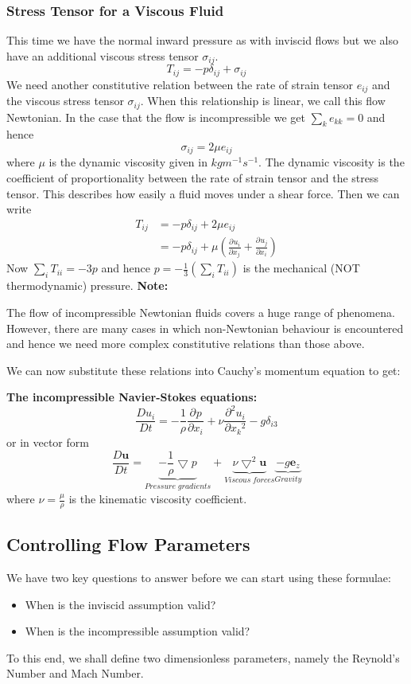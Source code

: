 \documentclass[11pt]{article}
\newcommand*{\pd}[3][]{\ensuremath{\frac{\partial^{#1} {#2}}{\partial {#3}^{#1}}}}
\newcommand*{\md}[1]{\ensuremath{\frac{D #1}{D t}}}
\newcommand{\grad}{\bigtriangledown}
\newcommand{\mv}[1]{\bm{#1}}
\newcommand{\mdf}[1]{{\color{red}#1}}
\newenvironment{note}
    {\textbf{Note:}\begin{mdframed}[backgroundcolor=white, roundcorner=5pt, linewidth=0pt]}
    {\end{mdframed}}
\newenvironment{formula}
	{\begin{mdframed}[backgroundcolor=white, roundcorner=5pt, linewidth=1pt, linecolor=red]}
	{\end{mdframed}}
\begin{document}
\subsubsection{Stress Tensor for a Viscous Fluid}
This time we have the normal inward pressure as with inviscid flows but we also have an additional \mdf{viscous stress tensor} $\sigma_{ij}$.
$$T_{ij}=-p\delta_{ij}+\sigma_{ij}$$
We need another constitutive relation between the rate of strain tensor $e_{ij}$ and the viscous stress tensor $\sigma_{ij}$.
When this relationship is linear, we call this flow \mdf{Newtonian}.
In the case that the flow is incompressible we get $\sum_k e_{kk}=0$ and hence
$$\sigma_{ij}=2\mu e_{ij}$$
where $\mu$ is the dynamic viscosity given in $kgm^{-1}s^{-1}$. The dynamic viscosity is the coefficient of proportionality between the rate of strain tensor and the stress tensor. This describes how easily a fluid moves under a shear force.
Then we can write
\begin{align*}
	T_{ij}&= -p\delta_{ij}+2\mu e_{ij}\\
		  &= -p\delta_{ij}+\mu\left(\pd{u_i}{x_j}+\pd{u_j}{x_i}\right)
\end{align*}
Now $\sum_i T_{ii} = -3p$ and hence $p=-\frac{1}{3}(\sum_i T_{ii})$ is the mechanical (NOT thermodynamic) pressure.
\begin{note}
The flow of incompressible Newtonian fluids covers a huge range of phenomena.
However, there are many cases in which non-Newtonian behaviour is encountered and hence we need more complex constitutive relations than those above.
\end{note}
We can now substitute these relations into Cauchy's momentum equation to get:
\begin{formula}
\textbf{The incompressible Navier-Stokes equations:}
$$\md{u_i}=-\frac{1}{\rho}\pd{p}{x_i}+\nu\pd[2]{u_i}{x_k}-g\delta_{i3}$$
or in vector form
$$\md{\mv{u}}=\underbrace{-\frac{1}{\rho}\grad{p}}_{Pressure\;gradients}+\underbrace{\nu\grad^2\mv{u}}_{Viscous\;forces}\underbrace{-g\mv{e}_z}_{Gravity}$$
where $\nu=\frac{\mu}{\rho}$ is the \mdf{kinematic viscosity coefficient}.
\end{formula}
\subsection{Controlling Flow Parameters}
We have two key questions to answer before we can start using these formulae:
\begin{itemize}
	\item When is the inviscid assumption valid?
	\item When is the incompressible assumption valid?
\end{itemize}
To this end, we shall define two \mdf{dimensionless parameters}, namely the Reynold's Number and Mach Number.
\end{document}
